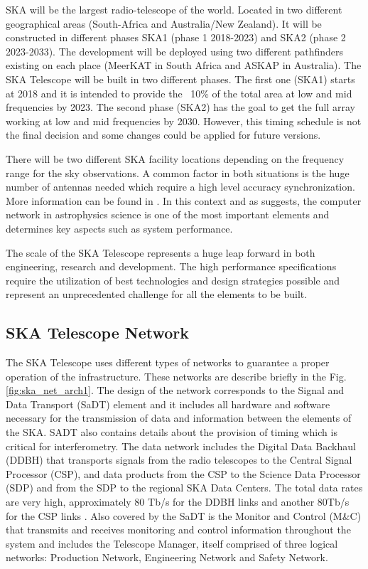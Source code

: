 SKA will be the largest radio-telescope of the 
world. Located in two different geographical areas (South-Africa and 
Australia/New Zealand). It will be 
constructed in different phases SKA1 (phase 1 2018-2023) and SKA2 (phase 2 
2023-2033). The development will be deployed using two different pathfinders 
existing on each place (MeerKAT in South Africa and ASKAP in Australia). 
The SKA Telescope will be built in two different phases. The first one (SKA1)
starts at 2018 and it is intended to provide the ~10\% of the total area at low and 
mid frequencies by 2023. The second phase (SKA2) has the goal to get the full
array working at low and mid frequencies by 2030. However, this timing schedule is
not the final decision and some changes could be applied for future versions.

There will be two different SKA facility locations depending on the frequency 
range for the sky observations. A common factor in both situations is the 
huge number of antennas needed which require a high level accuracy 
synchronization. More information can be found in  
\cite{ska:baseline_description_v2}. In this context and as \cite{HUANG201727} suggests, the computer network in astrophysics science is one of the most important elements and determines key aspects such as system performance.

The scale of the SKA Telescope represents a huge leap forward in both 
engineering, research and development. The high performance specifications 
require the utilization of best technologies and design strategies possible and 
represent an unprecedented challenge for all the elements to be built. 

\subsection{SKA Telescope Network} \label{subsec:ska-telescope}

The SKA Telescope uses different types of networks to guarantee a proper operation of the infrastructure. These networks are describe briefly in the Fig. \ref{fig:ska_net_arch1}. The design of the network corresponds to the Signal and Data Transport (SaDT) element \cite{ska:sadt_website} and it includes all hardware and software necessary for the transmission of data and information between the elements of the SKA. SADT also contains details about the provision of timing which is critical for interferometry.
The data network includes the Digital Data Backhaul (DDBH) that transports signals from the radio telescopes to the Central Signal Processor (CSP), and data products from the CSP to the Science Data Processor (SDP) and from the SDP to the regional SKA Data Centers. The total data rates are very high, approximately 80 Tb/s for the DDBH links and another 80Tb/s for the CSP links \cite{ska:consortia-news}. 
Also covered by the SaDT is the Monitor and Control (M\&C) that transmits and receives monitoring and control information throughout the system and includes the Telescope Manager, itself comprised of three logical networks: Production Network, Engineering Network and Safety Network.

